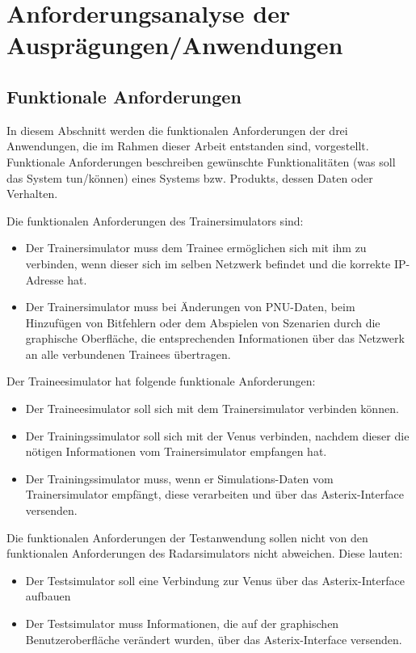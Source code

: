 \section{Anforderungsanalyse der Ausprägungen/Anwendungen}
\subsection{Funktionale Anforderungen}

In diesem Abschnitt werden die funktionalen Anforderungen der drei Anwendungen, die im Rahmen dieser Arbeit entstanden sind, vorgestellt.
Funktionale Anforderungen beschreiben gewünschte Funktionalitäten (was soll das System tun/können) eines Systems bzw. Produkts, dessen Daten oder
Verhalten\cite{funkAnf}.

Die funktionalen Anforderungen des Trainersimulators sind:

\begin{itemize}
    \item Der Trainersimulator muss dem Trainee ermöglichen sich mit ihm zu verbinden, wenn dieser sich im selben Netzwerk befindet und die korrekte IP-Adresse hat.
    \item Der Trainersimulator muss bei Änderungen von PNU-Daten, beim Hinzufügen von Bitfehlern oder dem Abspielen von Szenarien durch die graphische Oberfläche, die entsprechenden Informationen über das Netzwerk an alle verbundenen Trainees übertragen.
\end{itemize}

Der Traineesimulator hat folgende funktionale Anforderungen:
\begin{itemize}
    \item Der Traineesimulator soll sich mit dem Trainersimulator verbinden können.
    \item Der Trainingssimulator soll sich mit der Venus verbinden, nachdem dieser die nötigen Informationen vom Trainersimulator empfangen hat.
    \item Der Trainingssimulator muss, wenn er Simulations-Daten vom Trainersimulator empfängt, diese verarbeiten und über das Asterix-Interface versenden.
\end{itemize}

Die funktionalen Anforderungen der Testanwendung sollen nicht von den funktionalen Anforderungen des Radarsimulators nicht abweichen. Diese lauten:

\begin{itemize}
    \item Der Testsimulator soll eine Verbindung zur Venus über das Asterix-Interface aufbauen
    \item Der Testsimulator muss Informationen, die auf der graphischen Benutzeroberfläche verändert wurden, über das Asterix-Interface versenden.
\end{itemize}


